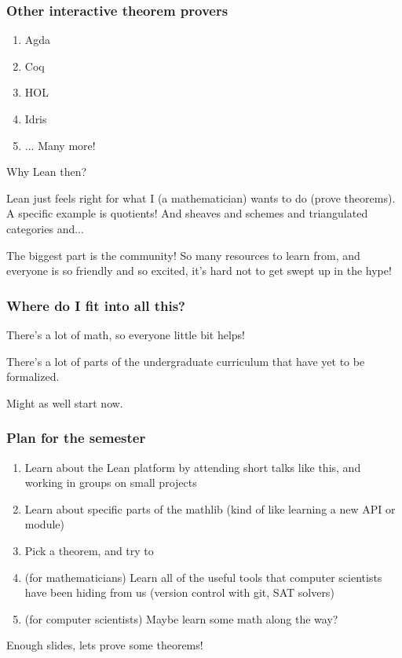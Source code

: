 \documentclass{beamer}
\begin{document}
\begin{frame}
    \frametitle{Other interactive theorem provers}
    \begin{enumerate}
        \item Agda
        \item Coq
        \item HOL
        \item Idris
        \item ... Many more!
    \end{enumerate}
    \vspace{20pt}
    \pause
    Why Lean then? 
    
    \vspace{20pt}
    \pause
    Lean just feels right for what I (a mathematician) wants to do (prove theorems). \pause A specific example is quotients! \pause And sheaves \pause and schemes \pause and triangulated categories \pause and...

    \vspace{20pt}
    \pause
    The biggest part is the community! So many resources to learn from, and everyone is so friendly and so excited, it's hard not to get swept up in the hype!
\end{frame}

\begin{frame}
    \frametitle{Where do I fit into all this?}
    There's a lot of math, so everyone little bit helps!

    \vspace{20pt}
    \pause
    There's a lot of parts of the undergraduate curriculum that have yet to be formalized.

    \vspace{20pt}
    \pause
    Might as well start now. 
\end{frame}

\begin{frame}
    \frametitle{Plan for the semester}
    \begin{enumerate}
        \item Learn about the Lean platform by attending short talks like this, and working in groups on small projects
        \item Learn about specific parts of the mathlib (kind of like learning a new API or module)
        \item Pick a theorem, and try to 
        \item (for mathematicians) Learn all of the useful tools that computer scientists have been hiding from us (version control with git, SAT solvers)
        \item (for computer scientists) Maybe learn some math along the way? 
    \end{enumerate}
\end{frame}

\begin{frame}
    Enough slides, lets prove some theorems!
\end{frame}
        
\end{document}
